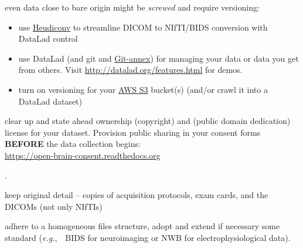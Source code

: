 \documentclass[letterpaper,landscape]{report}
\newcommand{\eg}[0]{\emph{e.g.},\ }
\begin{document}
\begin{multicols}{3}
\begin{description}[nolistsep,leftmargin=1pc,style=nextline]
\item[Version your data:] even data close to bare origin might be
  \emph{screwed} and require versioning:
  \begin{itemize}[nolistsep,leftmargin=1pc,style=nextline]
   \item use \href{https://github.com/nipy/heudiconv}{Heudiconv}
     to streamline DICOM to NIfTI/BIDS conversion with DataLad
     control
  \item use DataLad (and git and
    \href{http://git-annex.branchable.com}{Git-annex})
    for managing your data or data you get from others.
    Visit \url{http://datalad.org/features.html} for demos.
  \item turn on versioning for your \href{http://aws.amazon.com/s3}{AWS S3}
    bucket(s) (and/or crawl it into a DataLad dataset)
  \end{itemize}

\item[Stay legit:] clear up and state ahead ownership (copyright) and
  (public domain dedication) license for your dataset. Provision
  public sharing in your consent forms\\ \textbf{BEFORE} the data
  collection begins:\\ \url{https://open-brain-consent.readthedocs.org}

\end{description}
\vspace{27em}

{\tiny \color{white}.}
\columnbreak

\begin{description}[nolistsep,leftmargin=1pc,style=nextline]

\item[Keep detail:] keep original detail -- copies of acquisition
  protocols, exam cards, and the DICOMs (not only NIfTIs)

\item[Be comprehensible:] adhere to a homogeneous files structure,
  adopt and extend if necessary some standard
  (\eg\ BIDS for neuroimaging or NWB for electrophysiological data).


\end{description}
\end{multicols}
\end{document}
